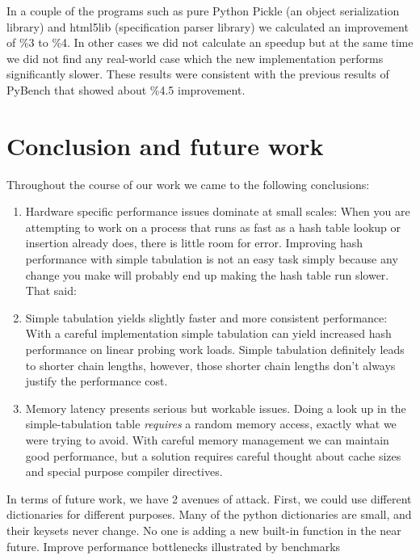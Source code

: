 \documentclass[12pt]{article}
\begin{document}


In a couple of the programs such as pure Python Pickle (an object serialization library) and html5lib (specification parser library) we calculated an improvement of \%3 to \%4. In other cases we did not calculate an speedup but at the same time we did not find any real-world case which the new implementation performs significantly slower. These results were consistent with the previous results of PyBench that showed about \%4.5 improvement.
 
\section{Conclusion and future work}
Throughout the course of our work we came to the following conclusions:
\begin{enumerate}
\item Hardware specific performance issues dominate at small scales: When you are attempting to work on a process that runs as fast as a hash table lookup or insertion already does, there is little room for error.  Improving hash performance with simple tabulation is not an easy task simply because any change you make will probably end up making the hash table run slower.  That said:

\item Simple tabulation yields slightly faster and more consistent performance: With a careful implementation simple tabulation can yield increased hash performance on linear probing work loads. Simple tabulation definitely leads to shorter chain lengths, however, those shorter chain lengths don’t always justify the performance cost.

\item Memory latency presents serious but workable issues.  Doing a look up in the simple-tabulation table \emph{requires} a random memory access, exactly what we were trying to avoid. With careful memory management we can maintain good performance, but a solution requires careful thought about cache sizes and special purpose compiler directives.

\end{enumerate}

In terms of future work, we have 2 avenues of attack. First, we could use different dictionaries for different purposes. Many of the python dictionaries are small, and their keysets never change. No one is adding a new built-in function in the near future. 
Improve performance bottlenecks illustrated by benchmarks
\end{document}
